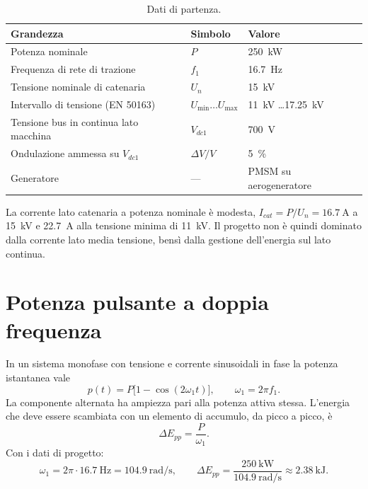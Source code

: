\begin{table}[h]
\centering
\begin{tabular}{lll}
\toprule
Grandezza & Simbolo & Valore \\
\midrule
Potenza nominale & $P$ & \SI{250}{\kilo\watt} \\
Frequenza di rete di trazione & $f_1$ & \SI{16.7}{\hertz} \\
Tensione nominale di catenaria & $U_n$ & \SI{15}{\kilo\volt} \\
Intervallo di tensione (EN 50163) & $U_{\min}\dots U_{\max}$ & \SI{11}{\kilo\volt} \dots \SI{17.25}{\kilo\volt} \\
Tensione bus in continua lato macchina & $V_{dc1}$ & \SI{700}{\volt} \\
Ondulazione ammessa su $V_{dc1}$ & $\Delta V/V$ & \SI{5}{\percent} \\
Generatore & --- & PMSM su aerogeneratore \\
\bottomrule
\end{tabular}
\caption{Dati di partenza.}
\end{table}

La corrente lato catenaria a potenza nominale è modesta,
$I_{cat}=P/U_n=\SI{16.7}{\ampere}$ a \SI{15}{\kilo\volt} e \SI{22.7}{\ampere} alla
tensione minima di \SI{11}{\kilo\volt}. Il progetto non è quindi dominato dalla corrente
lato media tensione, bensì dalla gestione dell'energia sul lato continua.

\section{Potenza pulsante a doppia frequenza}

In un sistema monofase con tensione e corrente sinusoidali in fase la potenza istantanea
vale
\begin{equation}
p(t) = P\bigl[1-\cos(2\omega_1 t)\bigr], \qquad \omega_1 = 2\pi f_1 .
\end{equation}
La componente alternata ha ampiezza pari alla potenza attiva stessa. L'energia che deve
essere scambiata con un elemento di accumulo, da picco a picco, è
\begin{equation}
\Delta E_{pp} = \frac{P}{\omega_1}.
\label{afe167:eq:energia}
\end{equation}
Con i dati di progetto:
\begin{equation}
\omega_1 = 2\pi\cdot\SI{16.7}{\hertz} = \SI{104.9}{\radian\per\second},
\qquad
\Delta E_{pp} = \frac{\SI{250}{\kilo\watt}}{\SI{104.9}{\radian\per\second}}
\approx \SI{2.38}{\kilo\joule}.
\end{equation}

